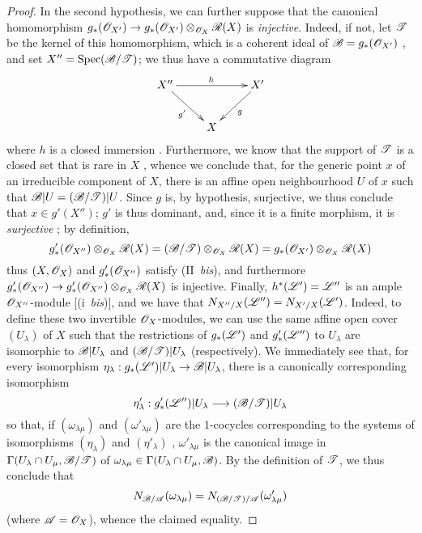 \begin{proof}
In the second hypothesis, we can further suppose that the canonical homomorphism $g_*(\sh{O}_{X'})\to g_*(\sh{O}_{X'})\otimes_{\sh{O}_X}\sh{R}(X)$ is \emph{injective}.
Indeed, if not, let $\mathscr{T}$ be the kernel of this homomorphism, which is a coherent ideal of $\mathscr{B}=g_*(\mathscr{O}_{X'})$ , and set $X''=\operatorname{Spec}(\mathscr{B}/\mathscr{T})$;
we thus have a commutative diagram
\[
  \xymatrix{
    X'' \ar[rr]^{h} \ar[dr]_{g'}
    && X' \ar[dl]^{g}
  \\&X
  }
\]
where $h$ is a closed immersion .
Furthermore, we know that the support of $\mathscr{T}$ is a closed set  that is rare in $X$ , whence we conclude that, for the generic point $x$ of an irreducible component of $X$, there is an affine open neighbourhood $U$ of $x$ such that $\mathscr{B}|U=(\mathscr{B}/\mathscr{T})|U$.
Since $g$ is, by hypothesis, surjective, we thus conclude that $x\in g'(X'')$;
$g'$ is thus dominant, and, since it is a finite morphism, it is \emph{surjective} ;
by definition,
\[
  g'_*(\mathscr{O}_{X''})\otimes_{\mathscr{O}_X}\mathscr{R}(X)
  = (\mathscr{B}/\mathscr{T})\otimes_{\mathscr{O}_X}\mathscr{R}(X)
  = g_*(\mathscr{O}_{X'})\otimes_{\mathscr{O}_X}\mathscr{R}(X)
\]
thus $(X,\mathscr{O}_X)$ and $g'_*(\mathscr{O}_{X''})$ satisfy (II~\emph{bis}), and furthermore $g'_*(\sh{O}_{X''})\to g'_*(\sh{O}_{X''})\otimes_{\sh{O}_X}\sh{R}(X)$ is injective.
Finally, $h^*(\mathscr{L}')=\mathscr{L}''$ is an ample $\mathscr{O}_{X''}$-module [(i~\emph{bis})], and we have that $N_{X''/X}(\mathscr{L}'')=N_{X'/X}(\mathscr{L}')$.
Indeed, to define these two invertible $\mathscr{O}_X$-modules, we can use the same affine open cover $(U_\lambda)$ of $X$ such that the restrictions of $g_*(\mathscr{L}')$ and $g'_*(\mathscr{L}'')$ to $U_\lambda$ are isomorphic to $\mathscr{B}|U_\lambda$ and $(\mathscr{B}/\mathscr{T})|U_\lambda$ (respectively).
We immediately see that, for every isomorphism $\eta_\lambda:g_*(\sh{L}')|U_\lambda\to\sh{B}|U_\lambda$, there is a canonically corresponding isomorphism
\[
  \eta'_\lambda : g'_*(\sh{L}'')|U_\lambda \to (\sh{B}/\sh{T})|U_\lambda
\]
so that, if $(\omega_{\lambda\mu})$ and $(\omega'_{\lambda\mu})$ are the $1$-cocycles corresponding to the systems of isomorphisms $(\eta_\lambda)$ and $(\eta'_\lambda)$ , $\omega'_{\lambda\mu}$ is the canonical image in $\Gamma(U_\lambda\cap U_\mu,\mathscr{B}/\mathscr{T})$ of $\omega_{\lambda\mu}\in\Gamma(U_\lambda\cap U_\mu,\mathscr{B})$.
By the definition of $\mathscr{T}$, we thus conclude that
\[
  N_{\mathscr{B}/\mathscr{A}}(\omega_{\lambda\mu}) = N_{(\mathscr{B}/\mathscr{T})/\mathscr{A}}(\omega'_{\lambda\mu})
\]
(where $\mathscr{A}=\mathscr{O}_X$), whence the claimed equality.


\end{proof}

